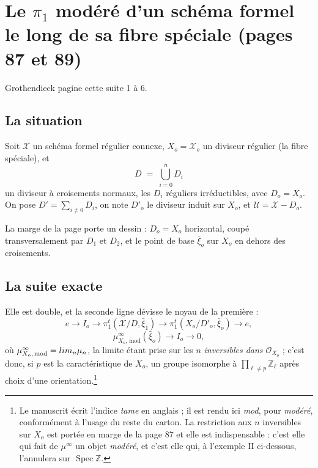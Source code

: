 \documentclass[11pt,a4paper]{article}
\begin{document}
\section*{Le $\pi_{1}$ modéré d'un schéma formel le long de sa fibre spéciale (pages 87 et 89)}

Grothendieck pagine cette suite 1 à 6.

\subsection*{La situation}

Soit $\mathcal{X}$ un schéma formel régulier connexe, $X_{o} = \mathcal{X}_{o}$
un diviseur régulier (la fibre spéciale), et
\[
  D \;=\; \bigcup_{i=0}^{n} D_{i}
\]
un diviseur à croisements normaux, les $D_{i}$ réguliers irréductibles, avec
$D_{o} = X_{o}$. On pose $D' = \sum_{i \neq 0} D_{i}$, on note $D'_{o}$ le
diviseur induit sur $X_{o}$, et $\mathcal{U} = \mathcal{X} - D_{o}$.

La marge de la page porte un dessin : $D_{o} = X_{o}$
horizontal, coupé transversalement par $D_{1}$ et $D_{2}$, et le point de base
$\bar{\xi}_{o}$ sur $X_{o}$ en dehors des croisements.

\subsection*{La suite exacte}

Elle est double, et la seconde ligne dévisse le noyau de la première :
\[
  e \longrightarrow I_{o} \longrightarrow
  \pi_{1}^{t}(\mathcal{X}/D, \bar{\xi}_{1}) \longrightarrow
  \pi_{1}^{t}(X_{o}/D'_{o}, \bar{\xi}_{o}) \longrightarrow e ,
\]
\[
  \mu^{\infty}_{X_{o},\,\mathrm{mod}}(\bar{\xi}_{o}) \longrightarrow
  I_{o} \longrightarrow 0 ,
\]
où $\mu^{\infty}_{X_{o},\,\mathrm{mod}} = \varprojlim_{n} \mu_{n}$, la limite
étant prise sur les $n$ \emph{inversibles dans $\mathcal{O}_{X_{o}}$} ; c'est donc,
si $p$ est la caractéristique de $X_{o}$, un groupe isomorphe à
$\prod_{\ell \neq p} \mathbb{Z}_{\ell}$ après choix d'une
orientation.\footnote{Le manuscrit écrit l'indice \emph{tame} en anglais ; il
est rendu ici \emph{mod}, pour \emph{modéré}, conformément à l'usage du reste
du carton. La restriction aux $n$ inversibles sur $X_{o}$ est portée en marge
de la page 87 et elle est indispensable : c'est elle qui fait de
$\mu^{\infty}$ un objet \emph{modéré}, et c'est elle qui, à l'exemple II
ci-dessous, l'annulera sur $\operatorname{Spec}\mathbb{Z}$.}
\end{document}
